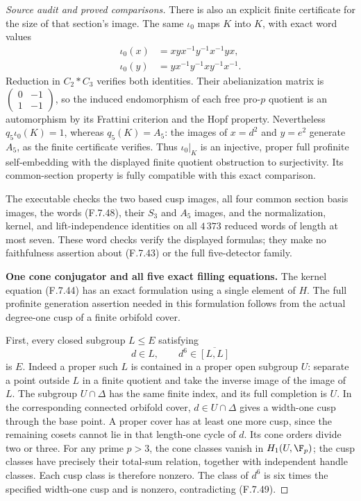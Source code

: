 \begin{proof}[Source audit and proved comparisons]
There is also an explicit finite certificate for
the size of that section's image.  The same
$\iota_0$ maps $K$ into $K$, with exact word values
\[
 \begin{split}
 \iota_0(x)&=xyx^{-1}y^{-1}x^{-1}yx,\\
 \iota_0(y)&=yx^{-1}y^{-1}xy^{-1}x^{-1}.
 \end{split}                                                   \tag{F.7.48}
\]
Reduction in $C_2*C_3$ verifies both identities.
Their abelianization matrix is
$\left(\begin{smallmatrix}0&-1\\1&-1\end{smallmatrix}\right)$,
so the induced endomorphism of each free pro-$p$
quotient is an automorphism by its Frattini
criterion and the Hopf property.  Nevertheless
$q_5\iota_0(K)=1$, whereas $q_5(K)=A_5$:
the images of $x=d^2$ and $y=e^2$ generate $A_5$,
as the finite certificate verifies.
Thus $\iota_0|_K$ is an injective, proper full
profinite self-embedding with the displayed
finite quotient obstruction to surjectivity.
Its common-section property is fully compatible
with this exact comparison.

The executable
checks the two based cusp images, all four common
section basis images, the words (F.7.48), their
$S_3$ and $A_5$ images, and the normalization,
kernel, and lift-independence identities on all
$4\,373$ reduced words of length at most seven.
These word checks verify the displayed formulas;
they make no faithfulness assertion about
(F.7.43) or the full five-detector family.


\medskip\noindent\textbf{One cone conjugator and all five exact filling equations.}
The kernel equation (F.7.44) has an exact formulation
using a single element of $H$.  The full profinite
generation assertion needed in this formulation
follows from the actual degree-one cusp of a finite
orbifold cover.

First, every closed subgroup $L\leq E$ satisfying
\[
              d\in L,\qquad d^6\in\overline{[L,L]}
                                                               \tag{F.7.49}
\]
is $E$.  Indeed a proper such $L$ is contained in a
proper open subgroup $U$: separate a point outside
$L$ in a finite quotient and take the inverse image
of the image of $L$.  The subgroup
$U\cap\Delta$ has the same finite index, and its full
completion is $U$.  In the corresponding connected
orbifold cover, $d\in U\cap\Delta$ gives a width-one
cusp through the base point.  A proper cover has
at least one more cusp, since the remaining cosets
cannot lie in that length-one cycle of $d$.
Its cone orders divide two or three.
For any prime $p>3$, the cone classes vanish in
$H_1(U,\F_p)$; the cusp classes have precisely their
total-sum relation, together with independent
handle classes.  Each cusp class is therefore
nonzero.  The class of $d^6$ is six times the
specified width-one cusp and is nonzero, contradicting
(F.7.49).


\end{proof}
